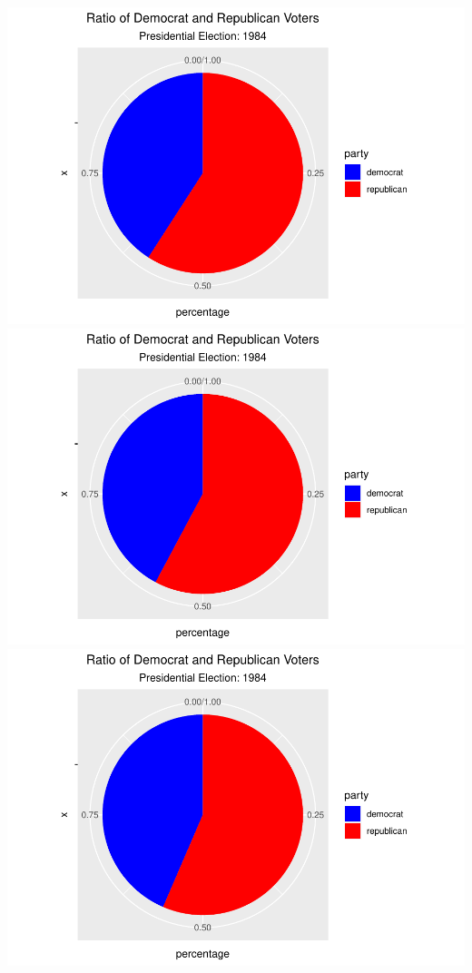 \documentclass[
]{article}
\begin{document}
\includegraphics{election_files/figure-latex/anim-25.pdf}
\includegraphics{election_files/figure-latex/anim-26.pdf}
\includegraphics{election_files/figure-latex/anim-27.pdf}
\end{document}
